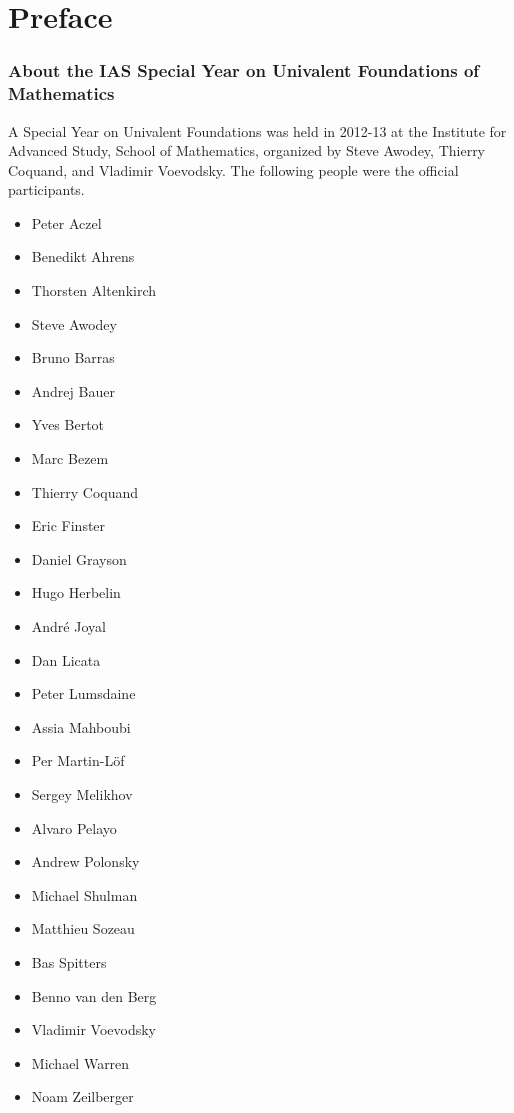 \chapter*{Preface}
\label{cha:preface}

\subsection*{About the IAS Special Year on Univalent Foundations of Mathematics}

A Special Year on Univalent Foundations was held in 2012-13 at the Institute for Advanced Study, School of Mathematics, organized by Steve Awodey, Thierry Coquand, and Vladimir Voevodsky.  The following people were the official participants.

\begin{multicols}{3}{
\begin{itemize}
\item[] Peter Aczel
\item[] Benedikt Ahrens
\item[] Thorsten Altenkirch
\item[] Steve Awodey
\item[] Bruno Barras
\item[] Andrej Bauer
\item[] Yves Bertot
\item[] Marc Bezem
\item[] Thierry Coquand
\item[] Eric Finster
\item[] Daniel Grayson
\item[] Hugo Herbelin
\item[] Andr\'e Joyal
\item[] Dan Licata
\item[] Peter Lumsdaine
\item[] Assia Mahboubi
\item[] Per Martin-L\"of
\item[] Sergey Melikhov
\item[] Alvaro Pelayo
\item[] Andrew Polonsky
\item[] Michael Shulman
\item[] Matthieu Sozeau
\item[] Bas Spitters
\item[] Benno van den Berg
\item[] Vladimir Voevodsky
\item[] Michael Warren
\item[] Noam Zeilberger
\end{itemize}
}
\end{multicols}

